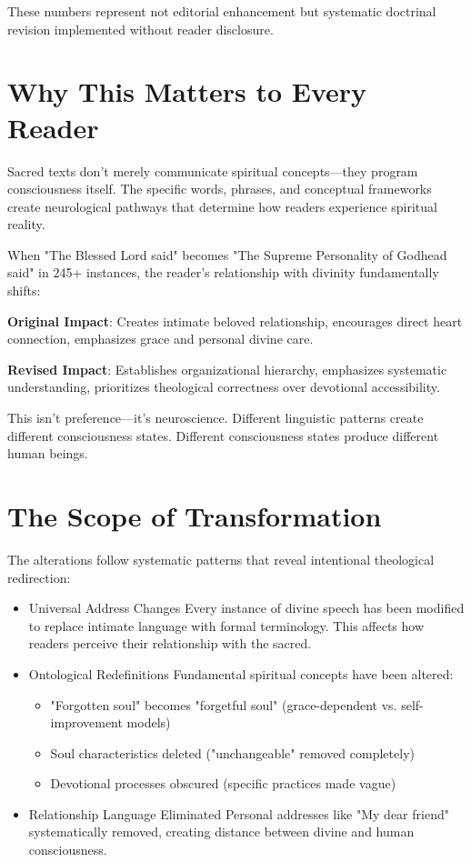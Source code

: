 \documentclass[11pt,twoside]{book}
\begin{document}
These numbers represent not editorial enhancement but systematic doctrinal revision implemented without reader disclosure.
\section*{Why This Matters to Every Reader}
\label{sec:org0d4de4d}

Sacred texts don't merely communicate spiritual concepts—they program consciousness itself. The specific words, phrases, and conceptual frameworks create neurological pathways that determine how readers experience spiritual reality.

When "The Blessed Lord said" becomes "The Supreme Personality of Godhead said" in 245+ instances, the reader's relationship with divinity fundamentally shifts:

\begin{pullquotebox}
\textbf{Original Impact}: Creates intimate beloved relationship, encourages direct heart connection, emphasizes grace and personal divine care.

\textbf{Revised Impact}: Establishes organizational hierarchy, emphasizes systematic understanding, prioritizes theological correctness over devotional accessibility.
\end{pullquotebox}

This isn't preference—it's neuroscience. Different linguistic patterns create different consciousness states. Different consciousness states produce different human beings.
\section*{The Scope of Transformation}
\label{sec:orgba51fb3}

The alterations follow systematic patterns that reveal intentional theological redirection:
\begin{itemize}
\item Universal Address Changes
\label{sec:orga6ce2bf}
Every instance of divine speech has been modified to replace intimate language with formal terminology. This affects how readers perceive their relationship with the sacred.
\item Ontological Redefinitions
\label{sec:orgcd3eae1}
Fundamental spiritual concepts have been altered:
\begin{itemize}
\item "Forgotten soul" becomes "forgetful soul" (grace-dependent vs. self-improvement models)
\item Soul characteristics deleted ("unchangeable" removed completely)
\item Devotional processes obscured (specific practices made vague)
\end{itemize}
\item Relationship Language Eliminated
\label{sec:org35f01c4}
Personal addresses like "My dear friend" systematically removed, creating distance between divine and human consciousness.

\sectionbreak
\end{itemize}
\end{document}
